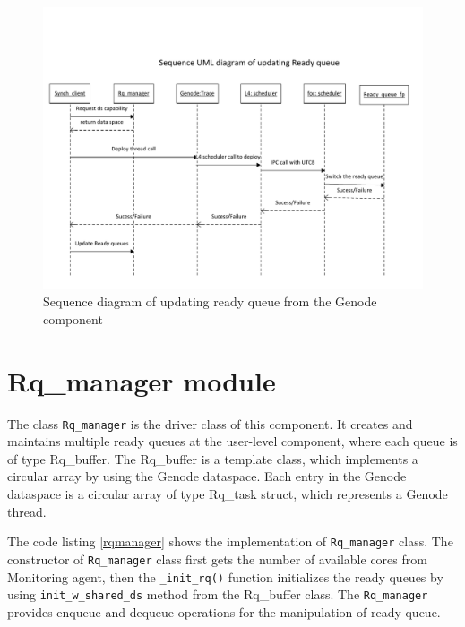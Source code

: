 \begin{figure}[h]
\centering
\includegraphics[width=1.0\linewidth]{figures/sequence_classUpdate}
\caption{Sequence diagram of updating ready queue from the Genode component}
\label{fig:sequence_classUpdate}
\end{figure}


\section{Rq\_manager module}

 The class \texttt{Rq\_manager} is the driver class of this component. It creates and maintains multiple ready queues at the user-level component, where each queue is of type Rq\_buffer. The Rq\_buffer is a template class, which implements a circular array by using the Genode dataspace. Each entry in the Genode dataspace is a circular array of type Rq\_task struct, which represents a Genode thread.

The code listing \ref{rqmanager} shows the implementation of \texttt{Rq\_manager} class. The constructor of \texttt{Rq\_manager} class first gets the number of available cores from Monitoring agent, then the \texttt{\_init\_rq()} function initializes the ready queues by using \texttt{init\_w\_shared\_ds} method from the Rq\_buffer class. The \texttt{Rq\_manager} provides enqueue and dequeue operations for the manipulation of ready queue.

